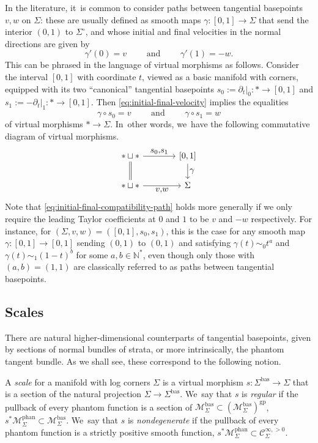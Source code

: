 \documentclass[10pt]{amsart}
\let\tst\textstyle
\theoremstyle{definition}
\theoremstyle{remark}
\newenvironment{remark}
  {\pushQED{\qed}\renewcommand{\qedsymbol}{$\lozenge$}\remarkx}
  {\popQED\endremarkx}
\let\defn\emph
\newcommand{\NN}{\mathbb{N}}
\newcommand{\cMbas}{\mathscr{M}^{\mathrm{bas}}}
\newcommand{\cMphan}{\mathscr{M}^{\mathrm{phan}}}
\newcommand{\Cinfpos}[1]{\mathscr{C}^{\infty, > 0}_{#1}}
\newcommand{\Sig}{\Sigma}
\newcommand{\bas}[1]{{#1}^{\mathrm{bas}}}
\newcommand{\Sigbas}{\bas{\Sig}}
\newcommand{\intSig}{\Sigma^\circ}
\begin{document}
\begin{remark}
In the literature, it~is common to consider paths between tangential basepoints $v, w$ on $\Sig$: these are usually defined as smooth maps $\gamma : [0,1] \to \Sig$ that send the interior $(0,1)$ to $\intSig$, and whose initial and final velocities in the normal directions are given by
\begin{equation}\label{eq:initial-final-velocity}
\gamma'(0)=v\qquad \mbox{ and } \qquad \gamma'(1)=-w.
\end{equation}
This can be phrased in the language of virtual morphisms as follows. Consider the interval $[0,1]$ with coordinate $t$, viewed as a basic manifold with corners, equipped with its two ``canonical'' tangential basepoints $s_0:=\partial_t|_0:*\to [0,1]$ and $s_1:=-\partial_t|_1:*\to [0,1]$. Then \eqref{eq:initial-final-velocity} implies the equalities
\begin{equation}\label{eq:initial-final-compatibility-path}
\gamma\circ s_0=v \qquad \mbox{ and } \qquad \gamma\circ s_1=w
\end{equation}
of virtual morphisms $*\to\Sig$. In~other words, we~have the following commutative diagram of virtual morphisms.
\begin{equation}\label{eq:diagram-path-between-tangential-basepoints}
\begin{tikzcd}
*\sqcup * \ar[r,"\tst s_0{,}s_1"] \ar[d,equal] &[.5cm] [0,1] \ar[d,"\tst \gamma"] \\
*\sqcup * \ar[r,"\tst v{,}w"'] & \Sig
\end{tikzcd}
\end{equation}
Note that \eqref{eq:initial-final-compatibility-path} holds more generally if we only require the leading Taylor coefficients at $0$ and $1$ to be $v$ and $-w$ respectively. For instance, for $(\Sig,v,w)=([0,1],s_0,s_1)$, this is the case for any smooth map $\gamma:[0,1]\to [0,1]$ sending $(0,1)$ to $(0,1)$ and satisfying $\gamma(t)\sim_0 t^a$ and $\gamma(t)\sim_1(1-t)^b$ for some $a,b\in\NN^*$, even though only those with $(a,b)=(1,1)$ are classically referred to as paths between tangential basepoints.
\end{remark}

\subsection{Scales}\label{sec:scales}
There are natural higher-dimensional counterparts of tangential basepoints, given by sections of normal bundles of strata, or more intrinsically, the phantom tangent bundle. As we shall see, these correspond to the following notion.
\begin{definition}\label{def:scale}
A \defn{scale} for a manifold with log corners $\Sig$ is a virtual morphism $s \colon \Sigbas \to \Sig$ that is a section of the natural projection $\Sig\to \Sigbas$. We~say that $s$ is \defn{regular} if the pullback of every phantom function is a section of $\cMbas_\Sigma\subset (\cMbas_\Sigma)^{\mathrm{gp}}$, \ie $s^*\cMphan_\Sig\subset \cMbas_\Sig$. We~say that $s$ is \defn{nondegenerate} if the pullback of every phantom function is a strictly positive smooth function, \ie $s^*\cMphan_{\Sig}\subset \Cinfpos{\Sig}$.
\end{definition}
\end{document}
